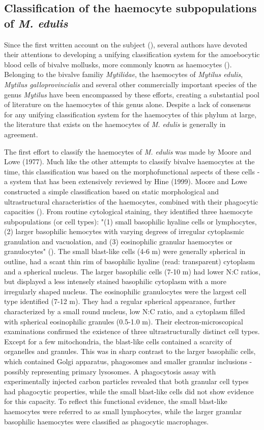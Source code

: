 \subsection{Classification of the haemocyte subpopulations of \emph{M. edulis}}
Since the first written account on the subject (\cite{Cuenot1891}), several authors have devoted their attentions to developing a unifying classification system for the amoebocytic blood cells of bivalve mollusks, more commonly known as haemocytes (\cite{Cheng1980, delaBallina2022}). Belonging to the bivalve familiy \emph{Mytilidae}, the haemocytes of \emph{Mytilus edulis}, \emph{Mytilus galloprovincialis} and several other commercially important species of the genus \emph{Mytilus} have been encompassed by these efforts, creating a substantial pool of literature on the haemocytes of this genus alone. Despite a lack of consensus for any unifying classification system for the haemocytes of this phylum at large, the literature that exists on the haemocytes of \emph{M. edulis} is generally in agreement.

The first effort to classify the haemocytes of \emph{M. edulis} was made by Moore and Lowe (1977). Much like the other attempts to classify bivalve haemocytes at the time, this classification was based on the morphofunctional aspects of these cells - a system that has been extensively reviewed by Hine (1999). Moore and Lowe constructed a simple classification based on static morphological and ultrastructural characteristics of the haemocytes, combined with their phagocytic capacities (\cite{Moore1977}). From routine cytological staining, they identified three haemocyte subpopulations (or cell types): "(1) small basophilic hyaline cells or lymphocytes, (2) larger basophilic hemocytes with varying degrees of irregular cytoplasmic granulation and vacuolation, and (3) eosinophilic granular haemocytes or granulocytes" (\cite{Moore1977}). The small blast-like cells (4-6 \micro m) were generally spherical in outline, had a scant thin rim of basophilic hyaline (read: transparent) cytoplasm and a spherical nucleus. The larger basophilic cells (7-10 \micro m) had lower N:C ratios, but displayed a less intensely stained basophilic cytoplasm with a more irregularly shaped nucleus. The eosinophilic granulocytes were the largest cell type identified (7-12 \micro m). They had a regular spherical appearance, further characterized by a small round nucleus, low N:C ratio, and a cytoplasm filled with spherical eosinophilic granules (0.5-1.0 \micro m). Their electron-microscopical examinations confirmed the existence of three ultrastructurally distinct cell types. Except for a few mitochondria, the blast-like cells contained a scarcity of organelles and granules. This was in sharp contrast to the larger basophilic cells, which contained Golgi apparatus, phagosomes and smaller granular inclusions - possibly representing primary lysosomes. A phagocytosis assay with experimentally injected carbon particles revealed that both granular cell types had phagocytic properties, while the small blast-like cells did not show evidence for this capacity. To reflect this functional evidence, the small blast-like haemocytes were referred to as small lymphocytes, while the larger granular basophilic haemocytes were classified as phagocytic macrophages.

